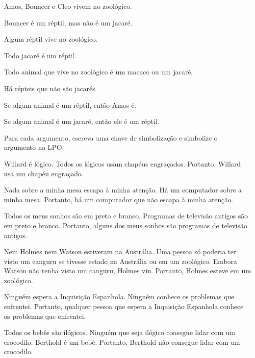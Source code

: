\begin{compactlist}
\item Amos, Bouncer e Cleo vivem no zoológico.
\item Bouncer é um réptil, mas não é um jacaré.
\item Algum réptil vive no zoológico.
\item Todo jacaré é um réptil.
\item Todo animal que vive no zoológico é um macaco ou um jacaré.
\item Há répteis que não são jacarés.
\item Se algum animal é um réptil, então Amos é.
\item Se algum animal é um jacaré, então ele é um réptil.
\end{compactlist}

\problempart
\label{pr.FOLarguments}
Para cada argumento, escreva uma chave de simbolização e simbolize o argumento na LPO.
\begin{compactlist}
\item Willard é lógico. Todos os lógicos usam chapéus engraçados. Portanto, Willard usa um chapéu engraçado.
\item Nada sobre a minha mesa escapa à minha atenção. Há um computador sobre a minha mesa. Portanto, há um computador que não escapa à minha atenção.
\item Todos os meus sonhos são em preto e branco. Programas de televisão antigos são em preto e branco. Portanto, alguns dos meus sonhos são programas de televisão antigos.
\item Nem Holmes nem Watson estiveram na Austrália. Uma pessoa só poderia ter visto um canguru se tivesse estado na Austrália ou em um zoológico. Embora Watson não tenha visto um canguru, Holmes viu. Portanto, Holmes esteve em um zoológico.
\item Ninguém espera a Inquisição Espanhola. Ninguém conhece os problemas que enfrentei. Portanto, qualquer pessoa que espera a Inquisição Espanhola conhece os problemas que enfrentei.
\item Todos os bebês são ilógicos. Ninguém que seja ilógico consegue lidar com um crocodilo. Berthold é um bebê. Portanto, Berthold não consegue lidar com um crocodilo.
\end{compactlist}

